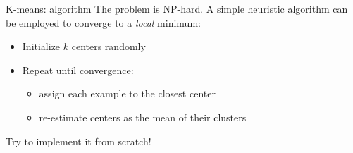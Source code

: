 \begin{frame}{K-means: algorithm}
The problem is NP-hard. A simple heuristic algorithm can be employed to converge to a \emph{local} minimum:
\begin{itemize}
\item Initialize $k$ centers randomly
\item Repeat until convergence:
\begin{itemize}
\item assign each example to the closest center
\item re-estimate centers as the mean of their clusters
\end{itemize}
\end{itemize}
Try to implement it from scratch!
\end{frame}